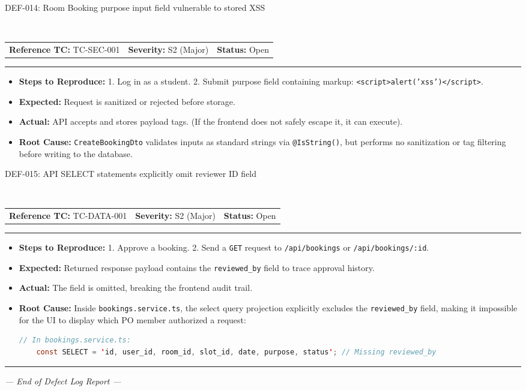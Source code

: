 \documentclass[11pt,a4paper]{article}
\makeatletter
\newcommand{\defectheader}[5]{%
    \needspace{6\baselineskip}
    \noindent\colorbox{primaryblue}{\parbox{\dimexpr\textwidth-2\fboxsep\relax}{
        \color{white}\bfseries\large\strut #1: #2
    }}
    \nopagebreak\\
    \noindent\begin{tabularx}{\textwidth}{@{}X X X@{}}
        \textbf{Reference TC:} #3 & \textbf{Severity:} #4 & \textbf{Status:} #5 \\
    \end{tabularx}
    \nopagebreak\vspace{0.1cm}
    \nopagebreak\hrule\vspace{0.2cm}
}
\makeatother
\begin{document}
\defectheader{DEF-014}{Room Booking purpose input field vulnerable to stored XSS}{TC-SEC-001}{S2 (Major)}{Open}
\begin{itemize}[noitemsep,topsep=1pt,leftmargin=0.5cm]
    \item \textbf{Steps to Reproduce:} 
    1. Log in as a student. 2. Submit purpose field containing markup: \texttt{<script>alert('xss')</script>}.
    \item \textbf{Expected:} Request is sanitized or rejected before storage.
    \item \textbf{Actual:} API accepts and stores payload tags. (If the frontend does not safely escape it, it can execute).
    \item \textbf{Root Cause:} \texttt{CreateBookingDto} validates inputs as standard strings via \texttt{@IsString()}, but performs no sanitization or tag filtering before writing to the database.
\end{itemize}

\newpage

\defectheader{DEF-015}{API SELECT statements explicitly omit reviewer ID field}{TC-DATA-001}{S2 (Major)}{Open}
\begin{itemize}[noitemsep,topsep=1pt,leftmargin=0.5cm]
    \item \textbf{Steps to Reproduce:} 
    1. Approve a booking. 2. Send a \texttt{GET} request to \texttt{/api/bookings} or \texttt{/api/bookings/:id}.
    \item \textbf{Expected:} Returned response payload contains the \texttt{reviewed\_by} field to trace approval history.
    \item \textbf{Actual:} The field is omitted, breaking the frontend audit trail.
    \item \textbf{Root Cause:} Inside \texttt{bookings.service.ts}, the select query projection explicitly excludes the \texttt{reviewed\_by} field, making it impossible for the UI to display which PO member authorized a request:
    \begin{lstlisting}[language=Java]
    // In bookings.service.ts:
    const SELECT = 'id, user_id, room_id, slot_id, date, purpose, status'; // Missing reviewed_by
    \end{lstlisting}
\end{itemize}

\vspace{0.4cm}\hrule\vspace{0.4cm}
\begin{center}
\textit{--- End of Defect Log Report ---}
\end{center}
\end{document}
